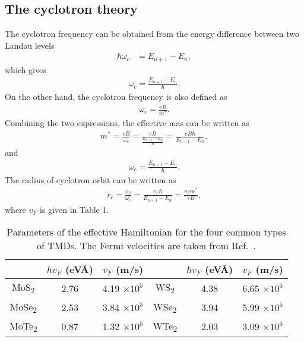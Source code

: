 \documentclass{article}
\begin{document}
\subsection{The cyclotron theory}
The cyclotron frequency can be obtained from the energy difference between two Landau levels
\begin{equation}
	\begin{aligned}
		\hbar \omega_{c} & = E_{n+1} - E_{n}  ,
	\end{aligned}
\end{equation}
which gives
\begin{equation}
	\begin{aligned}
		\omega_{c}  = \frac{E_{n+1} - E_{n}}{\hbar}.
	\end{aligned}
\end{equation}
On the other hand, the cyclotron frequency is also defined as
\begin{gather}
	\omega_{c}         = \frac{eB}{m^{*}}.
\end{gather}
Combining the two expressions, the effective mas can be written as
\begin{gather}
	m^{*}  =  \frac{eB}{\omega_{c}} = \frac{eB}{\frac{E_{n+1} - E_{n}}{\hbar}} = \frac{eB \hbar}{E_{n+1} - E_{n}},
\end{gather}
and
\begin{gather}
	\omega_{c} = \frac{E_{n+1} - E_{n}}{\hbar}.
\end{gather}
The radius of cyclotron orbit can be written as
\begin{gather}
	r_{c} = \frac{v_{F}}{\omega_{c}} = \frac{v_{F} \hbar}{E_{n+1} - E_{n}} = \frac{v_{F} m^{*}}{eB},
\end{gather}
where $v_{F}$ is given in Table 1.

\begin{table}[!h]
	\centering
	\renewcommand{\arraystretch}{2.0}
	\begin{tabular}{c c c | c c c}
		\hline\hline
		& $\hbar v_{F}$ (eV\AA) & $v_{F}$ (m/s) & & $\hbar v_{F}$ (eV\AA) & $v_{F}$ (m/s) \\ 
		\hline
		MoS\textsubscript{2}  & 2.76 & 4.19 $\times 10^{5}$ & WS\textsubscript{2}  & 4.38 & 6.65 $\times 10^{5}$ \\ \hline
		MoSe\textsubscript{2} & 2.53 & 3.84 $\times 10^{5}$ & WSe\textsubscript{2} & 3.94 & 5.99 $\times 10^{5}$ \\ \hline
		MoTe\textsubscript{2} & 0.87 & 1.32 $\times 10^{5}$ & WTe\textsubscript{2} & 2.03 & 3.09 $\times 10^{5}$ \\ 
		\hline\hline
	\end{tabular}
	\caption{Parameters of the effective Hamiltonian for the four common types of TMDs. The Fermi velocities are taken from Ref.~\cite{have2019,luo2016}.}
\end{table}
\end{document}
